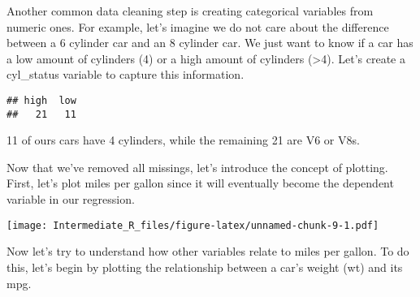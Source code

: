 \documentclass[]{article}
\newenvironment{Shaded}{\begin{snugshade}}{\end{snugshade}}
\newcommand{\KeywordTok}[1]{\textcolor[rgb]{0.13,0.29,0.53}{\textbf{#1}}}
\newcommand{\DecValTok}[1]{\textcolor[rgb]{0.00,0.00,0.81}{#1}}
\newcommand{\StringTok}[1]{\textcolor[rgb]{0.31,0.60,0.02}{#1}}
\newcommand{\CommentTok}[1]{\textcolor[rgb]{0.56,0.35,0.01}{\textit{#1}}}
\newcommand{\OperatorTok}[1]{\textcolor[rgb]{0.81,0.36,0.00}{\textbf{#1}}}
\newcommand{\NormalTok}[1]{#1}
\begin{document}
Another common data cleaning step is creating categorical variables from
numeric ones. For example, let's imagine we do not care about the
difference between a 6 cylinder car and an 8 cylinder car. We just want
to know if a car has a low amount of cylinders (4) or a high amount of
cylinders (\textgreater{}4). Let's create a cyl\_status variable to
capture this information.

\begin{Shaded}
\end{Shaded}

\begin{verbatim}
## high  low 
##   21   11
\end{verbatim}

11 of ours cars have 4 cylinders, while the remaining 21 are V6 or V8s.

Now that we've removed all missings, let's introduce the concept of
plotting. First, let's plot miles per gallon since it will eventually
become the dependent variable in our regression.

\begin{Shaded}
\end{Shaded}

\texttt{[image: Intermediate\_R\_files/figure-latex/unnamed-chunk-9-1.pdf]}

Now let's try to understand how other variables relate to miles per
gallon. To do this, let's begin by plotting the relationship between a
car's weight (wt) and its mpg.
\end{document}
